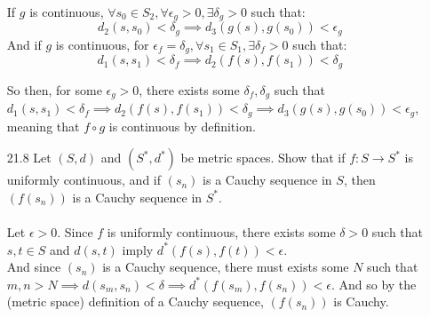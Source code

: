 \begin{enumerate}
    If $g$ is continuous, $\forall s_0 \in S_2, \forall \epsilon_g > 0, \exists \delta_g > 0$ such that:
    $$d_2(s,s_0) < \delta_g \implies d_3(g(s), g(s_0)) < \epsilon_g$$
    And if $g$ is continuous, for $\epsilon_f = \delta_g, \forall s_1 \in S_1, \exists \delta_f > 0$ such that:
    $$d_1(s,s_1) < \delta_f \implies d_2(f(s), f(s_1)) < \delta_g$$

    So then, for some $\epsilon_g > 0$, there exists some $\delta_f, \delta_g$ such that $d_1(s,s_1) < \delta_f \implies d_2(f(s),f(s_1)) < \delta_g \implies d_3(g(s),g(s_0)) < \epsilon_g$, meaning that $f \circ g$ is continuous by definition.
  \item [21.8]
    Let $(S,d)$ and $(S^*, d^*)$ be metric spaces. Show that if $f : S \rightarrow S^*$ is uniformly continuous, and if $(s_n)$ is a Cauchy sequence in $S$, then $(f(s_n))$ is a Cauchy sequence in $S^*$.\\\\

    Let $\epsilon > 0$. Since $f$ is uniformly continuous, there exists some $\delta > 0$ such that $s,t \in S$ and $d(s,t)$ imply $d^*(f(s),f(t)) < \epsilon$.\\

    And since $(s_n)$ is a Cauchy sequence, there must exists some $N$ such that $m,n > N \implies d(s_m,s_n) < \delta \implies d^*(f(s_m), f(s_n)) < \epsilon$. And so by the (metric space) definition of a Cauchy sequence, $(f(s_n))$ is Cauchy.
\end{enumerate}


